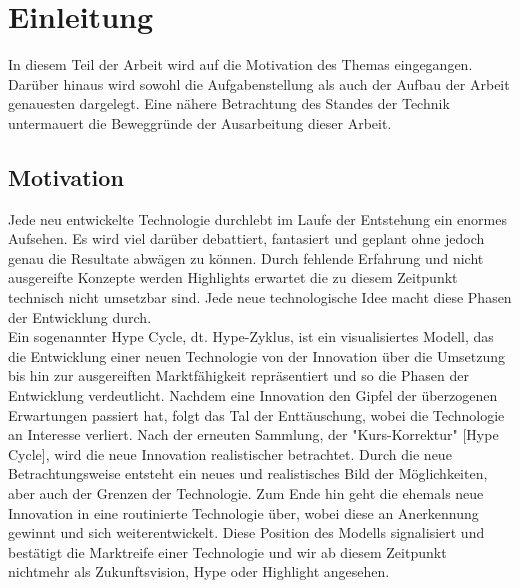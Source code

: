 
\chapter{Einleitung}
In diesem Teil der Arbeit wird auf die Motivation des Themas eingegangen. Darüber hinaus wird sowohl die Aufgabenstellung als auch der 
Aufbau der Arbeit genauesten dargelegt. Eine nähere Betrachtung des Standes der Technik untermauert die Beweggründe der Ausarbeitung 
dieser Arbeit. 
\section{Motivation}
Jede neu entwickelte Technologie durchlebt im Laufe der Entstehung ein enormes Aufsehen. Es wird viel darüber debattiert, fantasiert 
und geplant ohne jedoch genau die Resultate abwägen zu können. Durch fehlende Erfahrung und nicht ausgereifte Konzepte werden Highlights 
erwartet die zu diesem Zeitpunkt technisch nicht umsetzbar sind. Jede neue technologische Idee macht diese Phasen der Entwicklung durch. 
\\ 
\linebreak
Ein sogenannter Hype Cycle, dt. Hype-Zyklus, ist ein visualisiertes Modell, das die Entwicklung einer neuen Technologie von der 
Innovation über die Umsetzung bis hin zur ausgereiften Marktfähigkeit repräsentiert und so die Phasen der Entwicklung verdeutlicht. Nachdem 
eine Innovation den Gipfel der überzogenen Erwartungen passiert hat, folgt das Tal der Enttäuschung, wobei die Technologie an Interesse 
verliert. Nach der erneuten Sammlung, der "Kurs-Korrektur" \cite{dante.2010a}[Hype Cycle], wird die neue Innovation realistischer 
betrachtet. Durch die neue Betrachtungsweise entsteht ein neues und realistisches Bild der Möglichkeiten, aber auch der Grenzen der Technologie. 
Zum Ende hin geht die ehemals neue Innovation in eine routinierte Technologie über, wobei diese an Anerkennung gewinnt und sich weiterentwickelt. 
Diese Position des Modells signalisiert und bestätigt die Marktreife einer Technologie und wir ab diesem Zeitpunkt nichtmehr als Zukunftsvision, Hype oder Highlight angesehen.  

